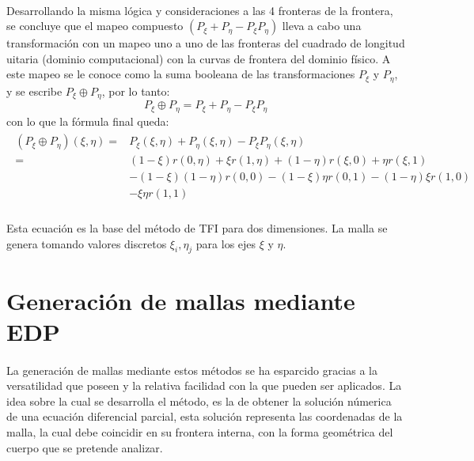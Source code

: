 \documentclass[letterpaper, openright, 12pt]{book}
\begin{document}
    \paragraph*{}
    Desarrollando la misma lógica y consideraciones a las 4 fronteras de la
    frontera, se concluye que el mapeo compuesto $(P_{\xi} + P_{\eta} - P_{\xi}P_{\eta})$
    lleva a cabo una transformación con un mapeo uno  a uno de las fronteras
    del cuadrado de longitud uitaria (dominio computacional) con la curvas
    de frontera del dominio físico. A este mapeo se le conoce como la suma
    booleana de las transformaciones $P_{\xi}$ y $P_{\eta}$, y se escribe
    $P_{\xi}\oplus P_{\eta}$, por lo tanto:
    \begin{equation}
        P_{\xi}\oplus P_{\eta} = P_{\xi} + P_{\eta} - P_{\xi} P_{\eta}
    \end{equation}
    con lo que la fórmula final queda:
    \begin{align}
        \begin{aligned}
            \left( P_{\xi}\oplus P_{\eta} \right)(\xi, \eta) =& P_{\xi}(\xi, \eta) + P_{\eta}(\xi, \eta) - P_{\xi}P_{\eta}(\xi, \eta) \\
            =& (1 - \xi)r(0, \eta) + \xi r(1, \eta) + (1 - \eta)r(\xi, 0) + \eta r(\xi, 1) \\&- (1-\xi)(1 - \eta)r(0, 0) - (1 - \xi)\eta r(0, 1) - (1- \eta)\xi r(1, 0) \\& - \xi \eta r(1,1)
        \end{aligned}
    \end{align}

    \paragraph*{}
    Esta ecuación es la base del método de TFI para dos dimensiones. La
    malla se genera tomando valores discretos $\xi_{i}, \eta_{j}$ para
    los ejes $\xi$ y $\eta$.

\section{Generación de mallas mediante EDP}
    \paragraph*{}
    La generación de mallas mediante estos métodos se ha esparcido gracias a
    la versatilidad que poseen y la relativa facilidad con la que pueden ser
    aplicados. La idea sobre la cual se desarrolla el método, es la de
    obtener la solución númerica de una ecuación diferencial parcial, esta
    solución representa las coordenadas de la malla, la cual debe coincidir
    en su frontera interna, con la forma geométrica del cuerpo que se
    pretende analizar.\cite{siladicParabolic}
\end{document}
